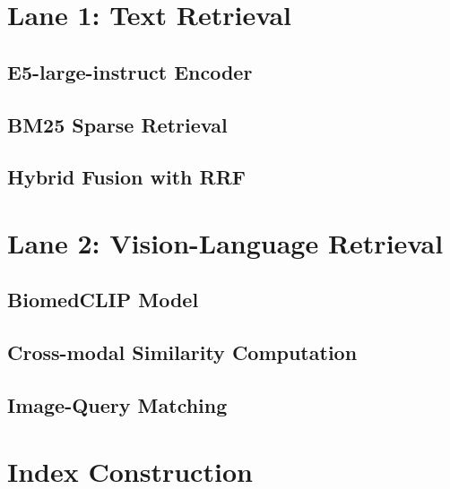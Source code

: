 %
%
\section{Lane 1: Text Retrieval}
\label{sec:methodology:lane1}

\subsection{E5-large-instruct Encoder}
\label{subsec:methodology:lane1:e5}

\subsection{BM25 Sparse Retrieval}
\label{subsec:methodology:lane1:bm25}

\subsection{Hybrid Fusion with RRF}
\label{subsec:methodology:lane1:rrf}

%
%
\section{Lane 2: Vision-Language Retrieval}
\label{sec:methodology:lane2}

\subsection{BiomedCLIP Model}
\label{subsec:methodology:lane2:biomedclip}

\subsection{Cross-modal Similarity Computation}
\label{subsec:methodology:lane2:similarity}

\subsection{Image-Query Matching}
\label{subsec:methodology:lane2:matching}

%
%
\section{Index Construction}
\label{sec:methodology:indexing}

